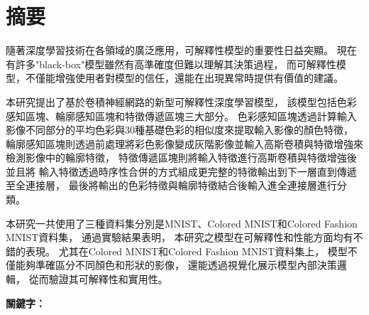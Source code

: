 \documentclass[class=NCU_thesis, crop=false]{standalone}
\begin{document}
\chapter{摘要}

隨著深度學習技術在各領域的廣泛應用，可解釋性模型的重要性日益突顯。
現在有許多"black-box"模型雖然有高準確度但難以理解其決策過程，
而可解釋性模型，不僅能增強使用者對模型的信任，還能在出現異常時提供有價值的建議。

本研究提出了基於卷積神經網路的新型可解釋性深度學習模型，
該模型包括色彩感知區塊、輪廓感知區塊和特徵傳遞區塊三大部分。
色彩感知區塊透過計算輸入影像不同部分的平均色彩與30種基礎色彩的相似度來提取輸入影像的顏色特徵，
輪廓感知區塊則透過前處理將彩色影像變成灰階影像並輸入高斯卷積與特徵增強來檢測影像中的輪廓特徵，
特徵傳遞區塊則將輸入特徵進行高斯卷積與特徵增強後並且將
輸入特徵透過時序性合併的方式組成更完整的特徵輸出到下一層直到傳遞至全連接層，
最後將輸出的色彩特徵與輪廓特徵結合後輸入進全連接層進行分類。

本研究一共使用了三種資料集分別是MNIST、Colored MNIST和Colored Fashion MNIST資料集，
通過實驗結果表明，
本研究之模型在可解釋性和性能方面均有不錯的表現。
尤其在Colored MNIST和Colored Fashion MNIST資料集上，
模型不僅能夠準確區分不同顏色和形狀的影像，
還能透過視覺化展示模型內部決策邏輯，
從而驗證其可解釋性和實用性。

\vspace{2em}
\noindent \textbf{關鍵字：} \keywordsZh{} %
\end{document}
